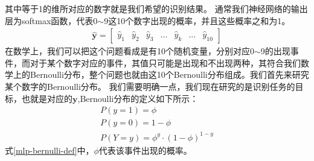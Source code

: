 \documentclass[UTF8]{article}
\begin{document}
其中等于1的维所对应的数字就是我们希望的识别结果。\newline
通常我们神经网络的输出层为softmax函数，代表0$\sim$9这10个数字出现的概率，并且这些概率之和为1。
\begin{equation}
\begin{aligned}
\hat{\boldsymbol{y}}=\begin{bmatrix}
\hat{y}_1 & \hat{y}_2 & \hat{y}_3 & ... & \hat{y}_k & ...& \hat{y}_{10}
\end{bmatrix}
\end{aligned}
\label{mlp-mnist-y-hat-def}
\end{equation}
在数学上，我们可以把这个问题看成是有10个随机变量，分别对应0$\sim$9的出现事件，而对于某个数字对应的事件，其值只可能是出现和不出现两种，其符合我们数学上的Bernoulli分布，整个问题也就由这10个Bernoulli分布组成。我们首先来研究某个数字的Bernoulli分布。\newline
我们需要明确一点，我们现在研究的是识别任务的目标，也就是对应的$\boldsymbol{y}$,Bernoulli分布的定义如下所示：
\begin{equation}
\begin{aligned}
P(y=1)=\phi \\
P(y=0)=1-\phi \\
P(Y=y)=\phi^y \cdot (1-\phi)^{1-y}
\end{aligned}
\label{mlp-bernulli-def}
\end{equation}
式\ref{mlp-bernulli-def}中，$\phi$代表该事件出现的概率。
\end{document}
